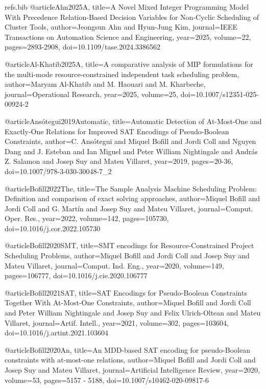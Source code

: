 \begin{filecontents}{refs.bib}
@article{Ahn2025A,
title={A Novel Mixed Integer Programming Model With Precedence Relation-Based Decision Variables for Non-Cyclic Scheduling of Cluster Tools},
author={Jeongsun Ahn and Hyun-Jung Kim},
journal={IEEE Transactions on Automation Science and Engineering},
year={2025},
volume={22},
pages={2893-2908},
doi={10.1109/tase.2024.3386562}
}

@article{Al-Khatib2025A,
title={A comparative analysis of MIP formulations for the multi-mode resource-constrained independent task scheduling problem},
author={Maryam Al-Khatib and M. Haouari and M. Kharbeche},
journal={Operational Research},
year={2025},
volume={25},
doi={10.1007/s12351-025-00924-2}
}

@article{Ansótegui2019Automatic,
title={Automatic Detection of At-Most-One and Exactly-One Relations for Improved SAT Encodings of Pseudo-Boolean Constraints},
author={C. Ansótegui and Miquel Bofill and Jordi Coll and Nguyen Dang and J. Esteban and Ian Miguel and Peter William Nightingale and András Z. Salamon and Josep Suy and Mateu Villaret},
year={2019},
pages={20-36},
doi={10.1007/978-3-030-30048-7_2}
}

@article{Bofill2022The,
title={The Sample Analysis Machine Scheduling Problem: Definition and comparison of exact solving approaches},
author={Miquel Bofill and Jordi Coll and G. Martín and Josep Suy and Mateu Villaret},
journal={Comput. Oper. Res.},
year={2022},
volume={142},
pages={105730},
doi={10.1016/j.cor.2022.105730}
}

@article{Bofill2020SMT,
title={SMT encodings for Resource-Constrained Project Scheduling Problems},
author={Miquel Bofill and Jordi Coll and Josep Suy and Mateu Villaret},
journal={Comput. Ind. Eng.},
year={2020},
volume={149},
pages={106777},
doi={10.1016/j.cie.2020.106777}
}

@article{Bofill2021SAT,
title={SAT Encodings for Pseudo-Boolean Constraints Together With At-Most-One Constraints},
author={Miquel Bofill and Jordi Coll and Peter William Nightingale and Josep Suy and Felix Ulrich-Oltean and Mateu Villaret},
journal={Artif. Intell.},
year={2021},
volume={302},
pages={103604},
doi={10.1016/j.artint.2021.103604}
}

@article{Bofill2020An,
title={An MDD-based SAT encoding for pseudo-Boolean constraints with at-most-one relations},
author={Miquel Bofill and Jordi Coll and Josep Suy and Mateu Villaret},
journal={Artificial Intelligence Review},
year={2020},
volume={53},
pages={5157 - 5188},
doi={10.1007/s10462-020-09817-6}
}


\end{filecontents}
